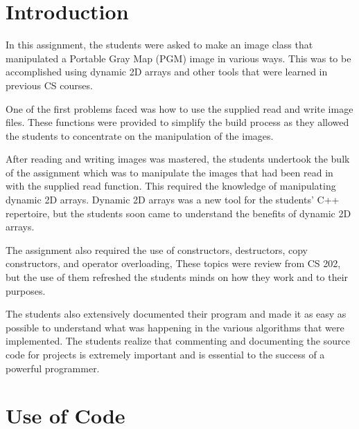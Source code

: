 \documentclass[pdftex, 11pt]{article}
\begin{document}


\pagestyle{fancy}
\renewcommand{\sectionmark}[1]{\markright{\thesection}}
\lhead{}
\cfoot{}
\renewcommand{\footrulewidth}{0.4pt}

\tableofcontents
\newpage

\cfoot{}
\renewcommand{\footrulewidth}{0.4pt}

\section{Introduction}

In this assignment, the students were asked to make an image class that manipulated a Portable Gray Map (PGM) image
in various ways. This was to be accomplished using dynamic 2D arrays and other tools that were learned in previous CS courses.

One of the first problems faced was how to use the supplied read and write image files.
These functions were provided to simplify the build process as they allowed the students to concentrate 
on the manipulation of the images.

After reading and writing images was mastered, the students undertook the bulk of the assignment which was to
manipulate the images that had been read in with the supplied read function. This required the knowledge of
manipulating dynamic 2D arrays. Dynamic 2D arrays was a new tool for the students' C++ repertoire, but the
students soon came to understand the benefits of dynamic 2D arrays.

The assignment also required the use of constructors, destructors, copy constructors, and operator overloading,
These topics were review from CS 202, but the use of them refreshed the students minds on how they work
and to their purposes.

The students also extensively documented their program and made it as easy as possible to understand what
was happening in the various algorithms that were implemented. The students realize that commenting
and documenting the source code for projects is extremely important and is essential to the success of
a powerful programmer.

\section{Use of Code}
\end{document}
